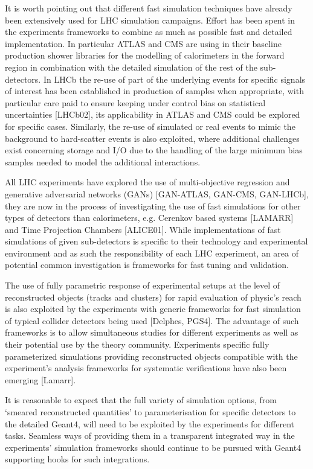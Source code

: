 \documentclass[10pt,a4paper]{article}
\begin{document}
It is worth pointing out that different fast simulation techniques have
already been extensively used for LHC simulation campaigns. Effort has
been spent in the experiments frameworks to combine as much as possible
fast and detailed implementation. In particular ATLAS and CMS are using
in their baseline production shower libraries for the modelling of
calorimeters in the forward region in combination with the detailed
simulation of the rest of the sub-detectors. In LHCb the re-use of part
of the underlying events for specific signals of interest has been
established in production of samples when appropriate, with particular
care paid to ensure keeping under control bias on statistical
uncertainties {[}LHCb02{]}, its applicability in ATLAS and CMS could be
explored for specific cases. Similarly, the re-use of simulated or real
events to mimic the background to hard-scatter events is also exploited,
where additional challenges exist concerning storage and I/O due to the
handling of the large minimum bias samples needed to model the
additional interactions.

All LHC experiments have explored the use of multi-objective regression
and generative adversarial networks (GANs) {[}GAN-ATLAS, GAN-CMS,
GAN-LHCb{]}, they are now in the process of investigating the use of
fast simulations for other types of detectors than calorimeters, e.g.
Cerenkov based systems {[}LAMARR{]} and Time Projection Chambers
{[}ALICE01{]}. While implementations of fast simulations of given
sub-detectors is specific to their technology and experimental
environment and as such the responsibility of each LHC experiment, an
area of potential common investigation is frameworks for fast tuning and
validation.

The use of fully parametric response of experimental setups at the level
of reconstructed objects (tracks and clusters) for rapid evaluation of
physic's reach is also exploited by the experiments with generic
frameworks for fast simulation of typical collider detectors being used
{[}Delphes, PGS4{]}. The advantage of such frameworks is to allow
simultaneous studies for different experiments as well as their
potential use by the theory community. Experiments specific fully
parameterized simulations providing reconstructed objects compatible
with the experiment's analysis frameworks for systematic verifications
have also been emerging {[}Lamarr{]}.

It is reasonable to expect that the full variety of simulation options,
from `smeared reconstructed quantities' to parameterisation for specific
detectors to the detailed Geant4, will need to be exploited by the
experiments for different tasks. Seamless ways of providing them in a
transparent integrated way in the experiments' simulation frameworks
should continue to be pursued with Geant4 supporting hooks for such
integrations.
\end{document}
